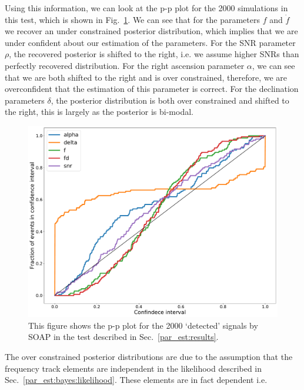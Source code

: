 Using this information, we can look at the p-p plot for the 2000  simulations in this test, which is shown in Fig.~\ref{par_est:results:ppplot}.
We can see that for the parameters $f$ and $\dot{f}$ we recover an under constrained posterior distribution, which implies that we are under confident about our estimation of the parameters.
For the \gls{SNR} parameter $\rho$, the recovered posterior is shifted to the right, i.e. we assume higher \glspl{SNR} than perfectly recovered distribution.
For the right ascension parameter $\alpha$, we can see that we are both shifted to the right and is over constrained, therefore, we are overconfident that the estimation of this parameter is correct.
For the declination parameters $\delta$, the posterior distribution is both over constrained and shifted to the right, this is largely as the posterior is bi-modal. 
%
\begin{figure}[ht]
    \centering
    \includegraphics[width=\linewidth]{C5_parameter/ppplot.pdf}
    \caption[p-p plot for the CW simulations]{This figure shows the p-p plot for the 2000 `detected' signals by SOAP in the test described in Sec.~\ref{par_est:results}. }
    \label{par_est:results:ppplot}
\end{figure}

The over constrained posterior distributions are due to the assumption that the frequency track elements are independent in the likelihood described in Sec.~\ref{par_est:bayes:likelihood}.
These elements are in fact dependent i.e. 

